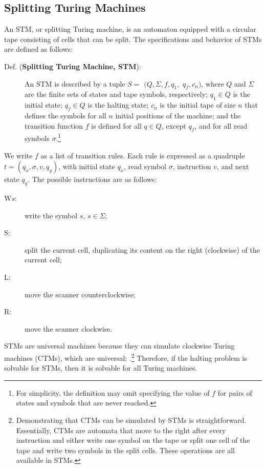 \documentclass[%
  manuscript=article,   %
  year=2024,
  volume=77,
  doi=10.59203/zfn.77.694,
]{zfn}
\begin{document}
\subsection{Splitting Turing Machines}\label{STMsec}

An STM, or splitting Turing machine, is an automaton equipped with a circular tape consisting of cells that can be split. The specifications and behavior of STMs are defined as follows:

\begin{description}
\item[Def. (\textbf{Splitting Turing Machine, STM}):] An \label{DefSTM} STM is described by a tuple $S =$ $(Q, \Sigma, f, q_1,$ $q_f, c_n)$, where $Q$ and $\Sigma$ are the finite sets of states and tape symbols, respectively; $q_1\in Q$ is the initial state; $q_f \in Q$ is the halting state; $c_n$ is the initial tape of size $n$ that defines the symbols for all $n$ initial positions of the machine; and the transition function $f$
is defined for all $q\in Q$, except $q_f$, and for all read symbols $\sigma$.\footnote{For simplicity, the definition may omit specifying the value of $f$ for pairs of states and symbols that are never reached.}
\end{description}

We write $f$ as a list of transition rules. Each rule is expressed as a quadruple $t = (q_x, \sigma, v, q_y)$, with initial state $q_x$, read symbol $\sigma$, instruction $v$, and next state $q_y$. The possible instructions are as follows:

\begin{description}
\item[W$s$:] write the symbol $s$, $s \in \Sigma$;
\item[S:] split the current cell, duplicating its content on the right (clockwise) of the current cell;
\item[L:] move the scanner counterclockwise;
\item[R:] move the scanner clockwise.
\end{description}

STMs are universal machines because they can simulate clockwise Turing machines (CTMs), which are universal; \parencite[cf.][pp.107-109]{Neary}.\footnote{Demonstrating that CTMs can be simulated by STMs is straightforward. Essentially, CTMs are automata that move to the right after every instruction and either write one symbol on the tape or split one cell of the tape and write two symbols in the split cells. These operations are all available in STMs.} Therefore, if the halting problem is solvable for STMs, then it is solvable for all Turing machines.
\end{document}

